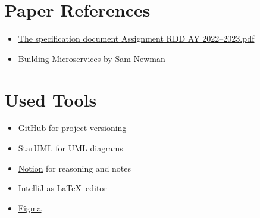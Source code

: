 \section{Paper References}
\label{sec:paper_references}%
\begin{itemize}
    \item \href{https://polimi365-my.sharepoint.com/:b:/g/personal/10685242_polimi_it/EWPABzzjfF9EsgYvSiuvdAIBAz6qnjdfLuPE8kwQSxeyCg?e=6qasKD}{The specification document Assignment RDD AY 2022--2023.pdf}
    \item \href{https://www.oreilly.com/library/view/building-microservices/9781491950340/}{Building Microservices by Sam Newman}
\end{itemize}


\section{Used Tools}
\label{sec:used_tools}%
\begin{itemize}
    \item \href{https://github.com/}{GitHub} for project versioning
    \item \href{https://staruml.io/}{StarUML} for UML diagrams
    \item \href{https://www.notion.so/}{Notion} for reasoning and notes
    \item \href{https://www.jetbrains.com/idea/}{IntelliJ} as \LaTeX\ editor
    \item \href{https://www.figma.com/}{Figma}
\end{itemize}
